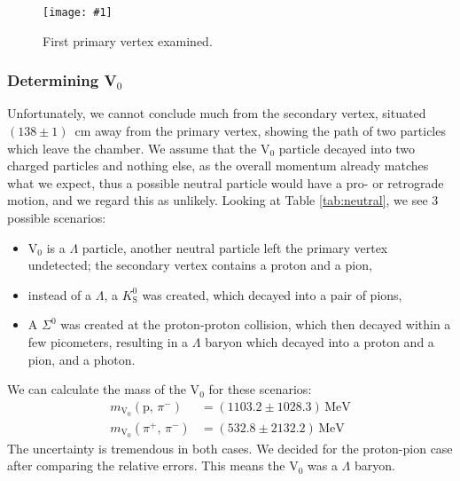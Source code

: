 \documentclass[twocolumn]{article}
\newcommand{\insertFigure}[1]{%
   \texttt{[image: \#1]}%
}
\begin{document}
\begin{figure}
\centering
\insertFigure{Images/primary_1.png}
\caption{First primary vertex examined.}
\label{fig:primary1}
\end{figure}
\subsubsection{Determining V$_0$}
Unfortunately, we cannot conclude much from the secondary vertex, situated $(138 \pm 1)$~cm away from the primary vertex, showing the path of two particles which leave the chamber. We assume that the V$_0$ particle decayed into two charged particles and nothing else, as the overall momentum already matches what we expect, thus a possible neutral particle would have a pro- or retrograde motion, and we regard this as unlikely. Looking at Table \ref{tab:neutral}, we see 3 possible scenarios:
\begin{itemize}
\item V$_0$ is a $\Lambda$ particle, another neutral particle left the primary vertex undetected; the secondary vertex contains a proton and a pion,
\item instead of a $\Lambda$, a $K^0_{\text{S}}$ was created, which decayed into a pair of pions,
\item A $\Sigma^0$ was created at the proton-proton collision, which then decayed within a few picometers, resulting in a $\Lambda$ baryon which decayed into a proton and a pion, and a photon.
\end{itemize}
We can calculate the mass of the V$_0$ for these scenarios:
\begin{align*}
m_{\text{V}_0} ( \text{p}, \, \pi^-) &= (1103.2 \pm 1028.3)\, \text{MeV}\\
m_{\text{V}_0} ( \pi^+, \, \pi^- ) &= (532.8 \pm 2132.2)\, \text{MeV}
\end{align*}
The uncertainty is tremendous in both cases. We decided for the proton-pion case after comparing the relative errors. This means the V$_0$ was a $\Lambda$ baryon.
\end{document}
